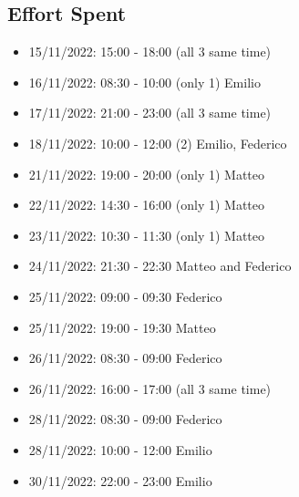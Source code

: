 \subsection{Effort Spent}
\begin{itemize}
    \item 15/11/2022: 15:00 - 18:00 (all 3 same time)
    \item 16/11/2022: 08:30 - 10:00 (only 1) Emilio
    \item 17/11/2022: 21:00 - 23:00 (all 3 same time)
    \item 18/11/2022: 10:00 - 12:00 (2) Emilio, Federico
    \item 21/11/2022: 19:00 - 20:00 (only 1) Matteo
    \item 22/11/2022: 14:30 - 16:00 (only 1) Matteo
    \item 23/11/2022: 10:30 - 11:30 (only 1) Matteo
    \item 24/11/2022: 21:30 - 22:30 Matteo and Federico
    \item 25/11/2022: 09:00 - 09:30 Federico
    \item 25/11/2022: 19:00 - 19:30 Matteo
    \item 26/11/2022: 08:30 - 09:00 Federico
    \item 26/11/2022: 16:00 - 17:00 (all 3 same time)
    \item 28/11/2022: 08:30 - 09:00 Federico
    \item 28/11/2022: 10:00 - 12:00 Emilio
    \item 30/11/2022: 22:00 - 23:00 Emilio
\end{itemize}